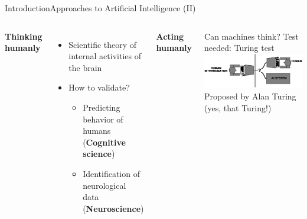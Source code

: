 \documentclass[10pt,compress]{beamer} %
\begin{document}
\begin{frame}{Introduction}{Approaches to Artificial Intelligence (II)}
	\begin{columns}
	   \begin{center}
	   	\textbf{Thinking humanly}
	   \end{center}
	   \begin{itemize}
	   \item Scientific theory of internal activities of the brain
	   \item How to validate?
	   		\begin{itemize}
	   		\item Predicting behavior of humans (\textbf{Cognitive science})
	   		\item Identification of neurological data (\textbf{Neuroscience})
	   		\end{itemize}
	   \end{itemize}
	   
	   	\begin{center}
	   		\textbf{Acting humanly}
	   	\end{center}
	   	Can machines think? Test needed: \alert{Turing test}\\
		\includegraphics[width=\linewidth]{figs/turing.eps}\\
		Proposed by Alan Turing (yes, that Turing!)
	\end{columns}
\end{frame}
\end{document}
